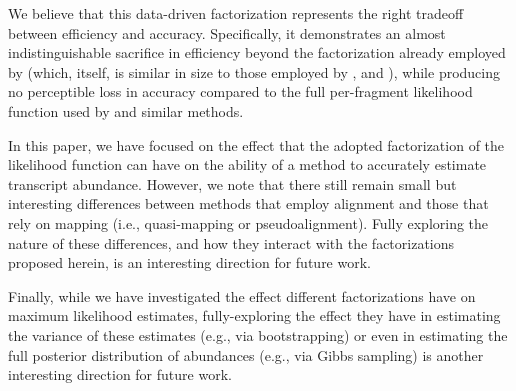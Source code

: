 We believe that this data-driven factorization represents the right tradeoff
between efficiency and accuracy. Specifically, it demonstrates an almost
indistinguishable sacrifice in efficiency beyond the factorization already
employed by \salmon (which, itself, is similar in size to those employed by
\mmseq, \sailfish and \kallisto), while producing no perceptible loss in
accuracy compared to the full per-fragment likelihood function used by \rsem and
similar methods.

In this paper, we have focused on the effect that the adopted factorization of
the likelihood function can have on the ability of a method to accurately
estimate transcript abundance. However, we note that there still remain small
but interesting differences between methods that employ alignment and those that
rely on mapping (i.e., quasi-mapping or pseudoalignment). Fully exploring the
nature of these differences, and how they interact with the factorizations
proposed herein, is an interesting direction for future work.

Finally, while we have investigated the effect different factorizations have on
maximum likelihood estimates, fully-exploring the effect they have in estimating
the variance of these estimates (e.g., via bootstrapping) or even in estimating
the full posterior distribution of abundances (e.g., via Gibbs sampling) is
another interesting direction for future work.\\